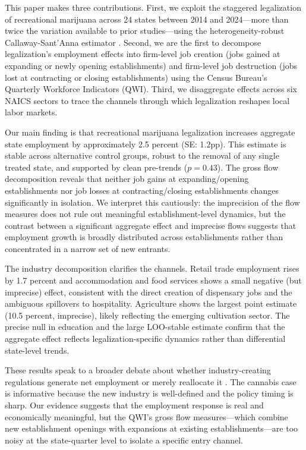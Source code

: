 \documentclass[12pt]{article}
\begin{document}
This paper makes three contributions. First, we exploit the staggered legalization of recreational marijuana across 24 states between 2014 and 2024---more than twice the variation available to prior studies---using the heterogeneity-robust Callaway-Sant'Anna estimator \citep{callaway2021}. Second, we are the first to decompose legalization's employment effects into firm-level job creation (jobs gained at expanding or newly opening establishments) and firm-level job destruction (jobs lost at contracting or closing establishments) using the Census Bureau's Quarterly Workforce Indicators (QWI). Third, we disaggregate effects across six NAICS sectors to trace the channels through which legalization reshapes local labor markets.

Our main finding is that recreational marijuana legalization increases aggregate state employment by approximately 2.5 percent (SE: 1.2pp). This estimate is stable across alternative control groups, robust to the removal of any single treated state, and supported by clean pre-trends ($p = 0.43$). The gross flow decomposition reveals that neither job gains at expanding/opening establishments nor job losses at contracting/closing establishments changes significantly in isolation. We interpret this cautiously: the imprecision of the flow measures does not rule out meaningful establishment-level dynamics, but the contrast between a significant aggregate effect and imprecise flows suggests that employment growth is broadly distributed across establishments rather than concentrated in a narrow set of new entrants.

The industry decomposition clarifies the channels. Retail trade employment rises by 1.7 percent and accommodation and food services shows a small negative (but imprecise) effect, consistent with the direct creation of dispensary jobs and the ambiguous spillovers to hospitality. Agriculture shows the largest point estimate (10.5 percent, imprecise), likely reflecting the emerging cultivation sector. The precise null in education and the large LOO-stable estimate confirm that the aggregate effect reflects legalization-specific dynamics rather than differential state-level trends.

These results speak to a broader debate about whether industry-creating regulations generate net employment or merely reallocate it \citep{cengiz2019, autor2013}. The cannabis case is informative because the new industry is well-defined and the policy timing is sharp. Our evidence suggests that the employment response is real and economically meaningful, but the QWI's gross flow measures---which combine new establishment openings with expansions at existing establishments---are too noisy at the state-quarter level to isolate a specific entry channel.
\end{document}
